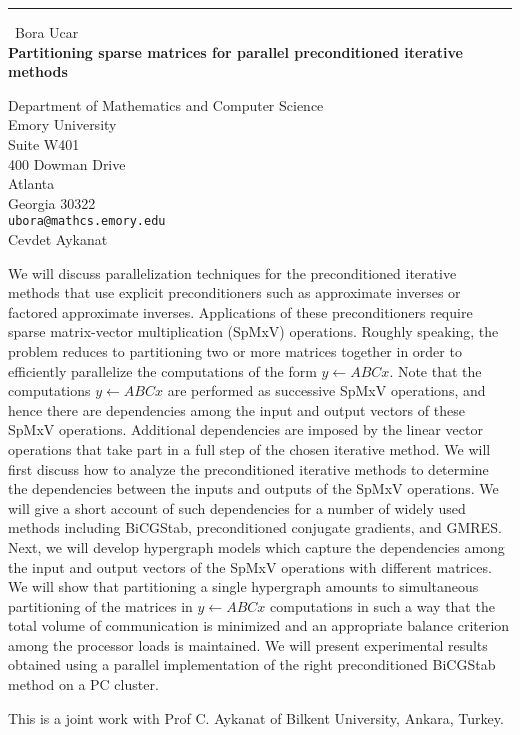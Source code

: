 \documentclass{report}
\begin{document}
\begin{center}
\rule{6in}{1pt} \
{\large Bora Ucar \\
{\bf Partitioning sparse matrices for parallel preconditioned iterative methods}}

Department of Mathematics and Computer Science \\ Emory University \\ Suite W401 \\ 400 Dowman Drive \\ Atlanta \\ Georgia 30322
\\
{\tt ubora@mathcs.emory.edu}\\
Cevdet Aykanat\end{center}

We will discuss parallelization techniques for the preconditioned
iterative methods that use explicit preconditioners such as approximate
inverses or factored approximate inverses. Applications of these
preconditioners require sparse matrix-vector multiplication (SpMxV)
operations. Roughly speaking, the problem reduces to partitioning two or
more matrices together in order to efficiently parallelize the
computations of the form $y\gets ABCx$. Note that the computations
$y\gets ABCx$ are performed as successive SpMxV operations, and hence
there are dependencies among the input and output vectors of these SpMxV
operations. Additional dependencies are imposed by the linear vector
operations that take part in a full step of the chosen iterative method.
We will first discuss how to analyze the preconditioned iterative methods
to determine the dependencies between the inputs and outputs of the SpMxV
operations. We will give a short account of such dependencies for a
number of widely used methods including BiCGStab, preconditioned
conjugate gradients, and GMRES. Next, we will develop hypergraph models
which capture the dependencies among the input and output vectors of the
SpMxV operations with different matrices. We will show that partitioning
a single hypergraph amounts to simultaneous partitioning of the matrices
in
$y\gets ABCx$ computations in such a way that the total volume of
communication is minimized and an appropriate balance criterion among the
processor loads is maintained. We will present experimental results
obtained using a parallel implementation of the right preconditioned
BiCGStab method on a PC cluster.

This is a joint work with Prof C. Aykanat of Bilkent University,
Ankara, Turkey.
\end{document}
